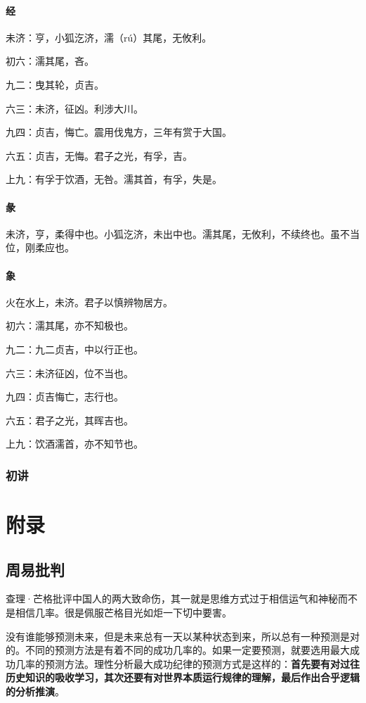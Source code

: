 \documentclass[12pt,oneside]{book}
\begin{document}
\subsection{经}
未济：亨，小狐汔济，濡（rú）其尾，无攸利。

初六：濡其尾，吝。

九二：曳其轮，贞吉。

六三：未济，征凶。利涉大川。

九四：贞吉，悔亡。震用伐鬼方，三年有赏于大国。

六五：贞吉，无悔。君子之光，有孚，吉。

上九：有孚于饮酒，无咎。濡其首，有孚，失是。

\subsection{彖}
未济，亨，柔得中也。小狐汔济，未出中也。濡其尾，无攸利，不续终也。虽不当位，刚柔应也。

\subsection{象}
火在水上，未济。君子以慎辨物居方。

初六：濡其尾，亦不知极也。

九二：九二贞吉，中以行正也。

六三：未济征凶，位不当也。

九四：贞吉悔亡，志行也。

六五：君子之光，其晖吉也。

上九：饮酒濡首，亦不知节也。

\section{初讲}








\part{附录}
\chapter{周易批判}
查理·芒格批评中国人的两大致命伤，其一就是思维方式过于相信运气和神秘而不是相信几率。很是佩服芒格目光如炬一下切中要害。

没有谁能够预测未来，但是未来总有一天以某种状态到来，所以总有一种预测是对的。不同的预测方法是有着不同的成功几率的。如果一定要预测，就要选用最大成功几率的预测方法。理性分析最大成功纪律的预测方式是这样的：\textbf{首先要有对过往历史知识的吸收学习，其次还要有对世界本质运行规律的理解，最后作出合乎逻辑的分析推演}。
\end{document}
